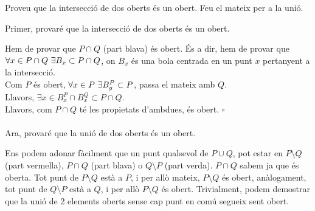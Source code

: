 \documentclass[a4paper, 12pt]{article}
\begin{document}
    \begin{exercici}
        Proveu que la intersecció de dos oberts és un obert. Feu el mateix per a la unió.
    \end{exercici}
    \begin{solucio}
        Primer, provaré que la intersecció de dos oberts és un obert.
        \begin{center}
        \end{center}
        Hem de provar que $P\cap Q$ (part blava) és obert. És a dir, hem de provar que $\forall x \in P\cap Q \hbox{ }\exists B_x \subset P\cap Q$,
        on $B_x$ és una bola centrada en un punt $x$ pertanyent a la intersecció.\\
        Com $P$ és obert, $\forall x \in P\hbox{ }\exists B_y^P \subset P$, passa el mateix amb $Q$.\\
        Llavors, $\exists x \in B_x^P \cap B_x^Q \subset P\cap Q$.\\
        Llavors, com $P\cap Q$ té les propietats d'ambdues, és obert.
        \hfill$\square$\\\\
        Ara, provaré que la unió de dos oberts és un obert.
        \begin{center}
        \end{center}
        Ens podem adonar fàcilment que un punt qualsevol de $P \cup Q$, pot estar en $P\setminus Q$
        (part vermella), $P\cap Q$ (part blava) o $Q\setminus P$ (part verda). $P\cap Q$ sabem ja
        que és oberta. Tot punt de $P\setminus Q$ està a $P$, i per allò mateix, $P\setminus Q$ és
        obert, anàlogament, tot punt de $Q\setminus P$ està a $Q$, i per allò $P\setminus Q$ és
        obert. Trivialment, podem demostrar que la unió de 2 elements oberts sense cap punt en comú
        segueix sent obert.  
    \end{solucio}
\end{document}
